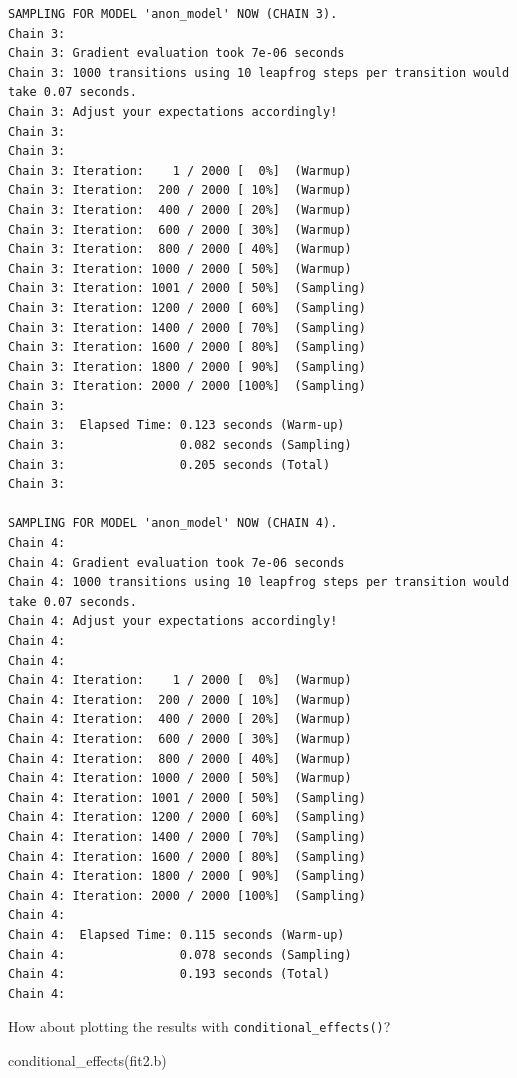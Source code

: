 \documentclass[
  letterpaper,
  DIV=11,
  numbers=noendperiod]{scrartcl}
\newenvironment{Shaded}{\begin{snugshade}}{\end{snugshade}}
\newcommand{\FunctionTok}[1]{\textcolor[rgb]{0.28,0.35,0.67}{#1}}
\newcommand{\NormalTok}[1]{\textcolor[rgb]{0.00,0.23,0.31}{#1}}
\begin{document}
\begin{verbatim}
SAMPLING FOR MODEL 'anon_model' NOW (CHAIN 3).
Chain 3: 
Chain 3: Gradient evaluation took 7e-06 seconds
Chain 3: 1000 transitions using 10 leapfrog steps per transition would take 0.07 seconds.
Chain 3: Adjust your expectations accordingly!
Chain 3: 
Chain 3: 
Chain 3: Iteration:    1 / 2000 [  0%]  (Warmup)
Chain 3: Iteration:  200 / 2000 [ 10%]  (Warmup)
Chain 3: Iteration:  400 / 2000 [ 20%]  (Warmup)
Chain 3: Iteration:  600 / 2000 [ 30%]  (Warmup)
Chain 3: Iteration:  800 / 2000 [ 40%]  (Warmup)
Chain 3: Iteration: 1000 / 2000 [ 50%]  (Warmup)
Chain 3: Iteration: 1001 / 2000 [ 50%]  (Sampling)
Chain 3: Iteration: 1200 / 2000 [ 60%]  (Sampling)
Chain 3: Iteration: 1400 / 2000 [ 70%]  (Sampling)
Chain 3: Iteration: 1600 / 2000 [ 80%]  (Sampling)
Chain 3: Iteration: 1800 / 2000 [ 90%]  (Sampling)
Chain 3: Iteration: 2000 / 2000 [100%]  (Sampling)
Chain 3: 
Chain 3:  Elapsed Time: 0.123 seconds (Warm-up)
Chain 3:                0.082 seconds (Sampling)
Chain 3:                0.205 seconds (Total)
Chain 3: 

SAMPLING FOR MODEL 'anon_model' NOW (CHAIN 4).
Chain 4: 
Chain 4: Gradient evaluation took 7e-06 seconds
Chain 4: 1000 transitions using 10 leapfrog steps per transition would take 0.07 seconds.
Chain 4: Adjust your expectations accordingly!
Chain 4: 
Chain 4: 
Chain 4: Iteration:    1 / 2000 [  0%]  (Warmup)
Chain 4: Iteration:  200 / 2000 [ 10%]  (Warmup)
Chain 4: Iteration:  400 / 2000 [ 20%]  (Warmup)
Chain 4: Iteration:  600 / 2000 [ 30%]  (Warmup)
Chain 4: Iteration:  800 / 2000 [ 40%]  (Warmup)
Chain 4: Iteration: 1000 / 2000 [ 50%]  (Warmup)
Chain 4: Iteration: 1001 / 2000 [ 50%]  (Sampling)
Chain 4: Iteration: 1200 / 2000 [ 60%]  (Sampling)
Chain 4: Iteration: 1400 / 2000 [ 70%]  (Sampling)
Chain 4: Iteration: 1600 / 2000 [ 80%]  (Sampling)
Chain 4: Iteration: 1800 / 2000 [ 90%]  (Sampling)
Chain 4: Iteration: 2000 / 2000 [100%]  (Sampling)
Chain 4: 
Chain 4:  Elapsed Time: 0.115 seconds (Warm-up)
Chain 4:                0.078 seconds (Sampling)
Chain 4:                0.193 seconds (Total)
Chain 4: 
\end{verbatim}

How about plotting the results with \texttt{conditional\_effects()}?

\begin{Shaded}
\begin{Highlighting}[]
\FunctionTok{conditional\_effects}\NormalTok{(fit2.b)}
\end{Highlighting}
\end{Shaded}
\end{document}
